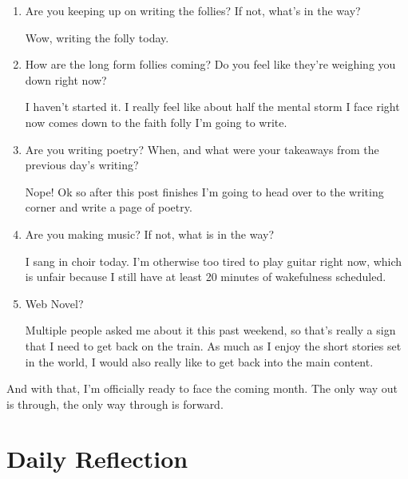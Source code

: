 \documentclass[12pt]{article}
\renewcommand{\,}{\textsuperscript{,}}
\begin{document}
\begin{enumerate}
\item Are you keeping up on writing the follies? If not, what's in the way?

Wow, writing the folly today.

\item How are the long form follies coming? Do you feel like they're weighing you down right now?

I haven't started it. I really feel like about half the mental storm I face right now comes down to the faith folly I'm going to write.

\item Are you writing poetry? When, and what were your takeaways from the previous day's writing?

Nope! Ok so after this post finishes I'm going to head over to the writing corner and write a page of poetry.

\item Are you making music? If not, what is in the way?

I sang in choir today.  
I'm otherwise too tired to play guitar right now, which is unfair because I still have at least 20 minutes of wakefulness scheduled.

\item Web Novel?

Multiple people asked me about it this past weekend, so that's really a sign that I need to get back on the train.  
As much as I enjoy the short stories set in the world, I would also really like to get back into the main content.

\end{enumerate}

And with that, I'm officially ready to face the coming month.  
The only way out is through, the only way through is forward.

\section{Daily Reflection}
\end{document}
